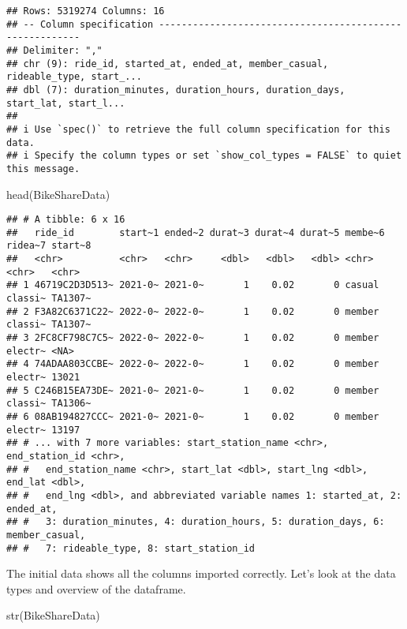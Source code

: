 \documentclass[
]{article}
\newenvironment{Shaded}{\begin{snugshade}}{\end{snugshade}}
\newcommand{\FunctionTok}[1]{\textcolor[rgb]{0.00,0.00,0.00}{#1}}
\newcommand{\NormalTok}[1]{#1}
\begin{document}
\begin{verbatim}
## Rows: 5319274 Columns: 16
## -- Column specification --------------------------------------------------------
## Delimiter: ","
## chr (9): ride_id, started_at, ended_at, member_casual, rideable_type, start_...
## dbl (7): duration_minutes, duration_hours, duration_days, start_lat, start_l...
## 
## i Use `spec()` to retrieve the full column specification for this data.
## i Specify the column types or set `show_col_types = FALSE` to quiet this message.
\end{verbatim}

\begin{Shaded}
\begin{Highlighting}[]
\FunctionTok{head}\NormalTok{(BikeShareData)}
\end{Highlighting}
\end{Shaded}

\begin{verbatim}
## # A tibble: 6 x 16
##   ride_id        start~1 ended~2 durat~3 durat~4 durat~5 membe~6 ridea~7 start~8
##   <chr>          <chr>   <chr>     <dbl>   <dbl>   <dbl> <chr>   <chr>   <chr>  
## 1 46719C2D3D513~ 2021-0~ 2021-0~       1    0.02       0 casual  classi~ TA1307~
## 2 F3A82C6371C22~ 2022-0~ 2022-0~       1    0.02       0 member  classi~ TA1307~
## 3 2FC8CF798C7C5~ 2022-0~ 2022-0~       1    0.02       0 member  electr~ <NA>   
## 4 74ADAA803CCBE~ 2022-0~ 2022-0~       1    0.02       0 member  electr~ 13021  
## 5 C246B15EA73DE~ 2021-0~ 2021-0~       1    0.02       0 member  classi~ TA1306~
## 6 08AB194827CCC~ 2021-0~ 2021-0~       1    0.02       0 member  electr~ 13197  
## # ... with 7 more variables: start_station_name <chr>, end_station_id <chr>,
## #   end_station_name <chr>, start_lat <dbl>, start_lng <dbl>, end_lat <dbl>,
## #   end_lng <dbl>, and abbreviated variable names 1: started_at, 2: ended_at,
## #   3: duration_minutes, 4: duration_hours, 5: duration_days, 6: member_casual,
## #   7: rideable_type, 8: start_station_id
\end{verbatim}

The initial data shows all the columns imported correctly. Let's look at
the data types and overview of the dataframe.

\begin{Shaded}
\begin{Highlighting}[]
\FunctionTok{str}\NormalTok{(BikeShareData)}
\end{Highlighting}
\end{Shaded}
\end{document}
